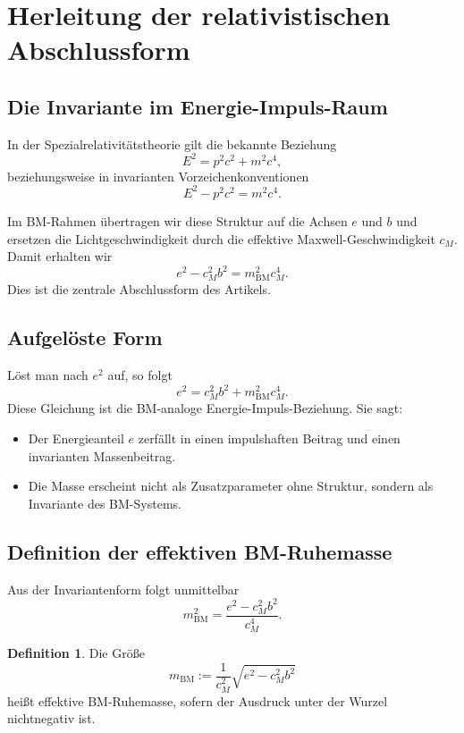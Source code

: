 \documentclass[11pt,a4paper]{article}
\theoremstyle{definition}
\newtheorem{definition}{Definition}[section]
\theoremstyle{plain}
\begin{document}
	\section{Herleitung der relativistischen Abschlussform}
	
	\subsection{Die Invariante im Energie-Impuls-Raum}
	
	In der Spezialrelativitätstheorie gilt die bekannte Beziehung
	\[
	E^2 = p^2 c^2 + m^2 c^4,
	\]
	beziehungsweise in invarianten Vorzeichenkonventionen
	\[
	E^2 - p^2 c^2 = m^2 c^4.
	\]
	
	Im BM-Rahmen übertragen wir diese Struktur auf die Achsen $e$ und $b$ und ersetzen die Lichtgeschwindigkeit durch die effektive Maxwell-Geschwindigkeit $c_M$. Damit erhalten wir
	\[
	e^2 - c_M^2 b^2 = m_{\mathrm{BM}}^2 c_M^4.
	\]
	Dies ist die zentrale Abschlussform des Artikels.
	
	\subsection{Aufgelöste Form}
	
	Löst man nach $e^2$ auf, so folgt
	\[
	e^2 = c_M^2 b^2 + m_{\mathrm{BM}}^2 c_M^4.
	\]
	Diese Gleichung ist die BM-analoge Energie-Impuls-Beziehung. Sie sagt:
	\begin{itemize}[leftmargin=2em]
		\item Der Energieanteil $e$ zerfällt in einen impulshaften Beitrag und einen invarianten Massenbeitrag.
		\item Die Masse erscheint nicht als Zusatzparameter ohne Struktur, sondern als Invariante des BM-Systems.
	\end{itemize}
	
	\subsection{Definition der effektiven BM-Ruhemasse}
	
	Aus der Invariantenform folgt unmittelbar
	\[
	m_{\mathrm{BM}}^2 = \frac{e^2 - c_M^2 b^2}{c_M^4}.
	\]
	
	\begin{definition}
		Die Größe
		\[
		m_{\mathrm{BM}} := \frac{1}{c_M^2}\sqrt{e^2 - c_M^2 b^2}
		\]
		heißt effektive BM-Ruhemasse, sofern der Ausdruck unter der Wurzel nichtnegativ ist.
	\end{definition}
	
\end{document}
